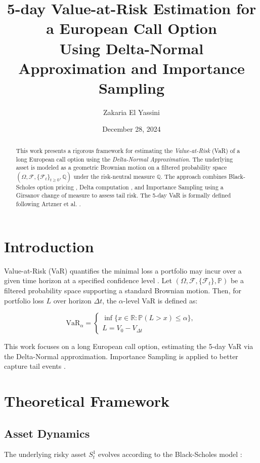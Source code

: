 \documentclass[11pt,a4paper]{article}
\title{5-day Value-at-Risk Estimation for a European Call Option \\ Using Delta-Normal Approximation and Importance Sampling}
\author{Zakaria El Yassini}
\date{December 28, 2024}
\begin{document}
\maketitle

\begin{abstract}
This work presents a rigorous framework for estimating the \textit{Value-at-Risk} (VaR) of a long European call option using the \textit{Delta-Normal Approximation}. The underlying asset is modeled as a geometric Brownian motion on a filtered probability space $(\Omega, \mathcal{F}, \{\mathcal{F}_t\}_{t \ge 0}, \mathbb{Q})$ under the risk-neutral measure $\mathbb{Q}$. The approach combines Black-Scholes option pricing \cite{BlackScholes1973}, Delta computation \cite{Hyndman2024}, and Importance Sampling using a Girsanov change of measure to assess tail risk. The 5-day VaR is formally defined following Artzner et al. \cite{Artzner1999}.
\end{abstract}

\section{Introduction}
Value-at-Risk (VaR) quantifies the minimal loss a portfolio may incur over a given time horizon at a specified confidence level \cite{Artzner1999}. Let $(\Omega, \mathcal{F}, \{\mathcal{F}_t\}, \mathbb{P})$ be a filtered probability space supporting a standard Brownian motion. Then, for portfolio loss $L$ over horizon $\Delta t$, the $\alpha$-level VaR is defined as:

\begin{equation*}
\text{VaR}_\alpha = 
\left\{
\begin{array}{l}
\inf\{x \in \mathbb{R} : \mathbb{P}(L > x) \le \alpha\}, \\[1mm]
L = V_0 - V_{\Delta t}
\end{array}
\right.
\end{equation*}

This work focuses on a long European call option, estimating the 5-day VaR via the Delta-Normal approximation. Importance Sampling is applied to better capture tail events \cite{Ross2012,Hyndman2024}.

\section{Theoretical Framework}

\subsection{Asset Dynamics}
The underlying risky asset $S_t^1$ evolves according to the Black-Scholes model \cite{BlackScholes1973,Merton1976}:
\end{document}
